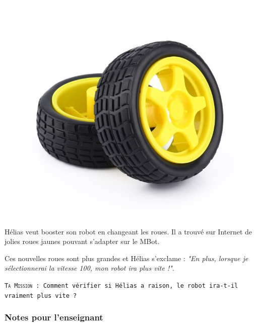 \begin{figure}
    \includegraphics[width=\linewidth]{res/mbot100.jpg}
\end{figure}

\begin{eleve}

Hélias veut booster son robot en changeant les roues. Il a trouvé sur Internet de jolies roues jaunes pouvant s'adapter sur le MBot.

Ces nouvelles roues sont plus grandes et Hélias s'exclame : \textit{"En plus, lorsque je sélectionnerai la vitesse 100, mon robot ira plus vite !"}.

    \texttt{\textsc{Ta Mission} : 
    Comment vérifier si Hélias a raison, le robot ira-t-il vraiment plus vite ?
    }
\end{eleve}



\subsubsection{Notes pour l'enseignant}

%
%

